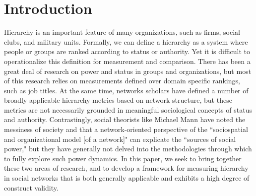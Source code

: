 \documentclass[3p,times]{elsarticle}
\begin{document}
\section{Introduction}
\label{sec:introduction}

Hierarchy is an important feature of many organizations, such as firms, social clubs, and military units. Formally, we can define a hierarchy as a system where people or groups are ranked according to status or authority. Yet it is difficult to operationalize this definition for measurement and comparison. There has been a great deal of research on power and status in groups and organizations, but most of this research relies on measurements defined over domain specific rankings, such as job titles. At the same time, networks scholars have defined a number of broadly applicable hierarchy metrics based on network structure, but these metrics are not necessarily grounded in meaningful sociological concepts of status and authority. Contrastingly, social theorists like Michael Mann have noted the messiness of society and that a network-oriented perspective of the ``sociospatial and organizational model [of a network]" can explicate the ``sources of social power," \cite{mann1986sources} but they have generally not delved into the methodologies through which to fully explore such power dynamics. In this paper, we seek to bring together these two areas of research, and to develop a framework for measuring hierarchy in social networks that is both generally applicable and exhibits a high degree of construct validity.


\end{document}
